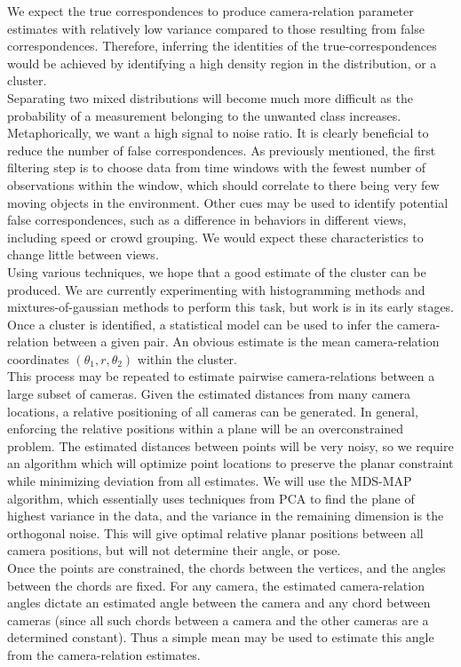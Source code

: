 \documentclass[journal]{IEEEtran}
\begin{document}
		\indent We expect the true correspondences to produce camera-relation parameter estimates with relatively low variance compared to those resulting from false correspondences. Therefore, inferring the identities of the true-correspondences would be achieved by identifying a high density region in the distribution, or a cluster. \\
		\indent Separating two mixed distributions will become much more difficult as the probability of a measurement belonging to the unwanted class increases. Metaphorically, we want a high signal to noise ratio. It is clearly beneficial to reduce the number of false correspondences. As previously mentioned, the first filtering step is to choose data from time windows with the fewest number of observations within the window, which should correlate to there being very few moving objects in the environment. Other cues may be used to identify potential false correspondences, such as a difference in behaviors in different views, including speed or crowd grouping. We would expect these characteristics to change little between views. \\
		\indent Using various techniques, we hope that a good estimate of the cluster can be produced. We are currently experimenting with histogramming methods and mixtures-of-gaussian methods to perform this task, but work is in its early stages. \\
		\indent Once a cluster is identified, a statistical model can be used to infer the camera-relation between a given pair. An obvious estimate is the mean camera-relation coordinates $(\theta_1,r,\theta_2)$ within the cluster. \\
		\indent This process may be repeated to estimate pairwise camera-relations between a large subset of cameras. Given the estimated distances from many camera locations, a relative positioning of all cameras can be generated. In general, enforcing the relative positions within a plane will be an overconstrained problem. The estimated distances between points will be very noisy, so we require an algorithm which will optimize point locations to preserve the planar constraint while minimizing deviation from all estimates. We will use the MDS-MAP algorithm, which essentially uses techniques from PCA to find the plane of highest variance in the data, and the variance in the remaining dimension is the orthogonal noise. This will give optimal relative planar positions between all camera positions, but will not determine their angle, or pose. \\
		\indent Once the points are constrained, the chords between the vertices, and the angles between the chords are fixed. For any camera, the estimated camera-relation angles dictate an estimated angle between the camera and any chord between cameras (since all such chords between a camera and the other cameras are a determined constant). Thus a simple mean may be used to estimate this angle from the camera-relation estimates.
		
\end{document}
